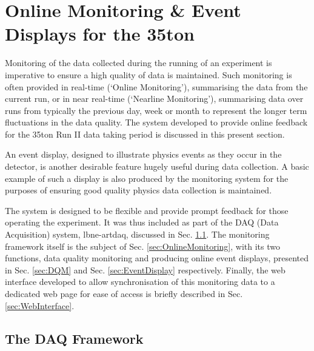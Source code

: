 
\chapter{Online Monitoring \& Event Displays for the 35ton}

Monitoring of the data collected during the running of an experiment is imperative to ensure a high quality of data is maintained.  Such monitoring is often provided in real-time (`Online Monitoring'), summarising the data from the current run, or in near real-time (`Nearline Monitoring'), summarising data over runs from typically the previous day, week or month to represent the longer term fluctuations in the data quality.  The system developed to provide online feedback for the 35ton Run II data taking period is discussed in this present section.

An event display, designed to illustrate physics events as they occur in the detector, is another desirable feature hugely useful during data collection.  A basic example of such a display is also produced by the monitoring system for the purposes of ensuring good quality physics data collection is maintained.

The system is designed to be flexible and provide prompt feedback for those operating the experiment.  It was thus included as part of the DAQ (Data Acquisition) system, lbne-artdaq, discussed in Sec. \ref{sec:lbne-artdaq}.  The monitoring framework itself is the subject of Sec. \ref{sec:OnlineMonitoring}, with its two functions, data quality monitoring and producing online event displays, presented in Sec. \ref{sec:DQM} and Sec. \ref{sec:EventDisplay} respectively.  Finally, the web interface developed to allow synchronisation of this monitoring data to a dedicated web page for ease of access is briefly described in Sec. \ref{sec:WebInterface}.

\section{The DAQ Framework}\label{sec:lbne-artdaq}

